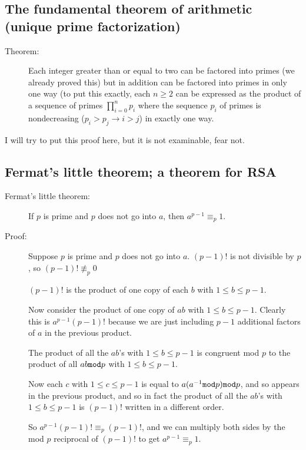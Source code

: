 \documentclass[12pt]{article}
\begin{document}
\subsection{The fundamental theorem of arithmetic (unique prime factorization)}
\begin{description}
\item[Theorem:]  Each integer greater than or equal to two can be factored into primes (we already proved this) but in addition can be factored into primes in only one way (to put this exactly, each $n \geq 2$ can be expressed as the product of a sequence of primes $\prod_{i=0}^n p_i$ where the sequence $p_i$ of primes is nondecreasing ($p_i>p_j \rightarrow i > j$) in exactly one way.
\end{description}

I will try to put this proof here, but it is not examinable, fear not.

\subsection{Fermat's little theorem; a theorem for RSA}

\begin{description}

\item[Fermat's little theorem:] If $p$ is prime and $p$ does not go into $a$, then $a^{p-1}\equiv_p 1$.
\item[Proof:]  Suppose $p$ is prime and $p$ does not go into $a$.  $(p-1)!$ is not divisible by $p$, so $(p-1)! \not\equiv_p0$

$(p-1)!$ is the product of one copy of each $b$ with $1 \leq b \leq p-1$.

Now consider the product of one copy of $ab$ with $1 \leq b \leq p-1$.  Clearly this is
$a^{p-1}(p-1)!$ because we are just including $p-1$ additional factors of $a$ in the previous product.

The product of all the $ab$'s with $1 \leq b \leq p-1$ is congruent mod $p$ to the product of all
$ab{\tt mod}p$ with $1 \leq b \leq p-1$.

Now each $c$ with $1 \leq c \leq p-1$ is equal to $a(a^{-1}{\tt mod}p) {\tt mod} p$, and so appears in the previous product, and so in fact the product of all the $ab$'s with $1 \leq b \leq p-1$ is $(p-1)!$ written in a different order.

So $a^{p-1}(p-1)! \equiv_p (p-1)!$, and we can multiply both sides by the mod $p$ reciprocal of $(p-1)!$ to
get $a^{p-1} \equiv_p 1$.
\end{description}
\end{document}
